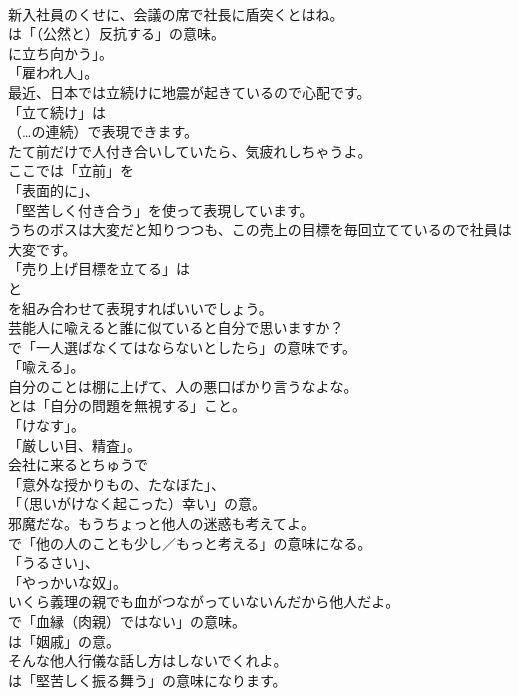 \documentclass[8pt]{extreport}
\begin{document}
\begin{CJK}{UTF8}{min}
\\	新入社員のくせに、会議の席で社長に盾突くとはね。 
\\	は「（公然と）反抗する」の意味。
\\	に立ち向かう」。
\\	「雇われ人」。	
\\	最近、日本では立続けに地震が起きているので心配です。 
\\	「立て続け」は
\\	（…の連続）で表現できます。	
\\	たて前だけで人付き合いしていたら、気疲れしちゃうよ。 
\\	ここでは「立前」を
\\	「表面的に」、
\\	「堅苦しく付き合う」を使って表現しています。	
\\	うちのボスは大変だと知りつつも、この売上の目標を毎回立てているので社員は大変です。 
\\	「売り上げ目標を立てる」は 
\\	と 
\\	を組み合わせて表現すればいいでしょう。	
\\	芸能人に喩えると誰に似ていると自分で思いますか？ 
\\	で「一人選ばなくてはならないとしたら」の意味です。
\\	「喩える」。	
\\	自分のことは棚に上げて、人の悪口ばかり言うなよな。 
\\	とは「自分の問題を無視する」こと。
\\	「けなす」。
\\	「厳しい目、精査」。	
\\	会社に来るとちゅうで 
\\	「意外な授かりもの、たなぼた」、
\\	「（思いがけなく起こった）幸い」の意。	
\\	邪魔だな。もうちょっと他人の迷惑も考えてよ。 
\\	で「他の人のことも少し／もっと考える」の意味になる。
\\	「うるさい」、
\\	「やっかいな奴」。	
\\	いくら義理の親でも血がつながっていないんだから他人だよ。 
\\	で「血縁（肉親）ではない」の意味。
\\	は「姻戚」の意。	
\\	そんな他人行儀な話し方はしないでくれよ。 
\\	は「堅苦しく振る舞う」の意味になります。	

\end{CJK}
\end{document}
